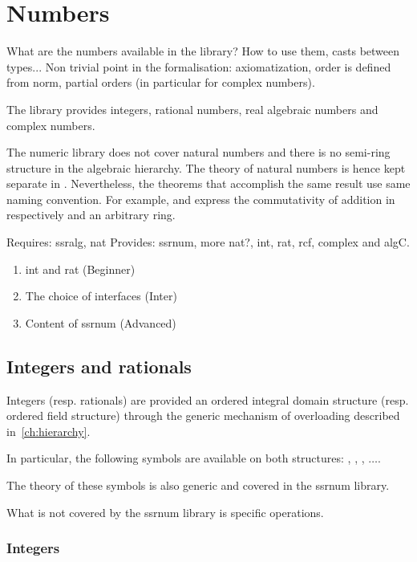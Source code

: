 \chapter{Numbers}

What are the numbers available in the library? How to use them, casts
between types... Non trivial point in the formalisation:
axiomatization, order is defined from norm, partial orders (in
particular for complex numbers).


The library provides integers, rational numbers, real algebraic
numbers and complex numbers.

The numeric library does not cover natural numbers and there is no
semi-ring structure in the algebraic hierarchy. The theory of natural
numbers is hence kept separate in . Nevertheless, the
theorems that accomplish the same result use same naming
convention. For example,  and  express the
commutativity of addition in respectively  and an arbitrary
ring.

Requires: ssralg, nat
Provides: ssrnum, more nat?, int, rat, rcf, complex and algC.

\begin{enumerate}
\item int and rat (Beginner)
\item The choice of interfaces (Inter)
\item Content of ssrnum (Advanced)
\end{enumerate}

\section{Integers and rationals}
\label{sec:integers-rationals}

Integers (resp. rationals) are provided an ordered integral domain
structure (resp. ordered field structure) through the
generic mechanism of overloading described in~\ref{ch:hierarchy}.

In particular, the following symbols are available on both structures:
, , \C{+}, $\ldots$.

The theory of these symbols is also generic and covered in the ssrnum
library.

What is not covered by the ssrnum library is specific operations.

\subsection{Integers}
\label{sec:integers}

